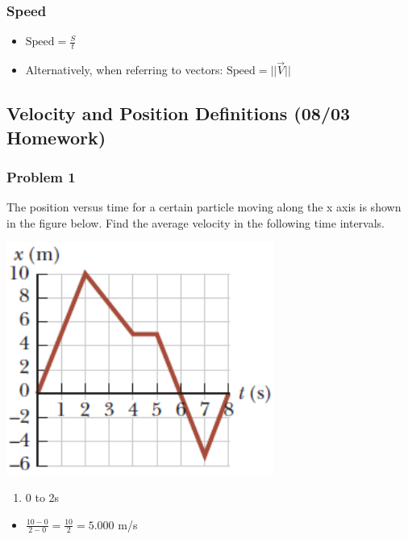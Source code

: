 \documentclass[
  letterpaper,
  DIV=11,
  numbers=noendperiod]{scrartcl}
\providecommand{\tightlist}{%
  \setlength{\itemsep}{0pt}\setlength{\parskip}{0pt}}\usepackage{longtable,booktabs,array}
\begin{document}
\hypertarget{speed}{%
\subsubsection{Speed}\label{speed}}

\begin{itemize}
\tightlist
\item
  \(\text{Speed} = \frac{S}{t}\)
\item
  Alternatively, when referring to vectors:
  \(\text{Speed} = ||\vec{V}||\)
\end{itemize}

\hypertarget{velocity-and-position-definitions-0803-homework}{%
\subsection{Velocity and Position Definitions (08/03
Homework)}\label{velocity-and-position-definitions-0803-homework}}

\hypertarget{problem-1}{%
\subsubsection{Problem 1}\label{problem-1}}

The position versus time for a certain particle moving along the x axis
is shown in the figure below. Find the average velocity in the following
time intervals.

\includegraphics{img/Kinematics Velocity and Position HW/problem1.png}

\begin{enumerate}
\def\labelenumi{(\alph{enumi})}
\tightlist
\item
  0 to 2s
\end{enumerate}

\begin{itemize}
\tightlist
\item
  \(\frac{10-0}{2-0} = \frac{10}{2} = 5.000\) m/s
\end{itemize}
\end{document}
